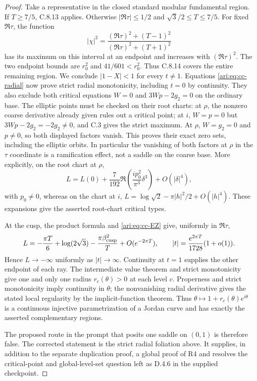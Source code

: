\begin{proof}
Take a representative in the closed standard modular fundamental
region. If $T\ge7/5$, C.8.13 applies. Otherwise
$|\Re\tau|\le1/2$ and $\sqrt3/2\le T\le7/5$. For fixed
$\Re\tau$, the function
\[
 |\chi|^2=\frac{(\Re\tau)^2+(T-1)^2}
                    {(\Re\tau)^2+(T+1)^2}
\]
has its maximum on this interval at an endpoint and increases
with $(\Re\tau)^2$. The two endpoint bounds are $r_0^2$
and $41/601<r_0^2$. Thus C.8.14 covers the entire remaining
region. We conclude $|1-X|<1$ for every $t\ne1$.
Equations \eqref{ari:eq:cc-radial} now prove strict radial
monotonicity, including $t=0$ by continuity. They also exclude
both critical equations $W=0$ and $3Wp-2g_2=0$ on the
ordinary base. The elliptic points must be checked on their
root charts: at $\rho$, the nonzero coarse derivative already
given rules out a critical point; at $i$, $W=p=0$ but $3Wp-2g_2=-2g_2\ne0$, and C.3 gives
the strict maximum. At $\rho$, $W=g_2=0$ and $p\ne0$,
so both displayed factors vanish. This proves their exact zero
sets, including the elliptic orbits. In particular the vanishing of both factors at
$\rho$ in the $\tau$ coordinate is a ramification effect,
not a saddle on the coarse base. More explicitly, on the root
chart at $\rho$,
\[
 L=L(0)+\frac7{192}\Re\left(\frac{ip_0^2}{\pi^3}\delta^3\right)
                   +O(|\delta|^4),
\]
with $p_0\ne0$, whereas on the chart at $i$,
$L=\log\sqrt2-\pi|h|^2/2+O(|h|^4)$.
These expansions give the asserted root-chart critical types.

At the cusp, the product formula and \eqref{ari:eq:cc-EZ} give,
uniformly in $\Re\tau$,
\[
 L=-\frac{\pi T}{6}+\log(2\sqrt3)-
                      \frac{\pi\beta_{\rm cusp}^2}{T}+O(e^{-2\pi T}),
 \qquad |t|=\frac{e^{2\pi T}}{1728}(1+o(1)).
\]
Hence $L\to-\infty$ uniformly as $|t|\to\infty$.
Continuity at $t=1$ supplies the other endpoint of each ray.
The intermediate value theorem and strict monotonicity give
one and only one radius $r_c(\theta)>0$ at each level $c$.
Properness and strict monotonicity imply continuity in $\theta$;
the nonvanishing radial derivative gives the stated local
regularity by the implicit-function theorem. Thus
$\theta\mapsto1+r_c(\theta)e^{i\theta}$ is a continuous
injective parametrization of a Jordan curve and has exactly
the asserted complementary regions.

The proposed route in the prompt that posits one saddle on
$(0,1)$ is therefore false. The corrected statement is the
strict radial foliation above. It supplies, in addition to
the separate duplication proof, a global proof of R4 and
resolves the critical-point and global-level-set question
left as D.4.6 in the supplied checkpoint.
\end{proof}
